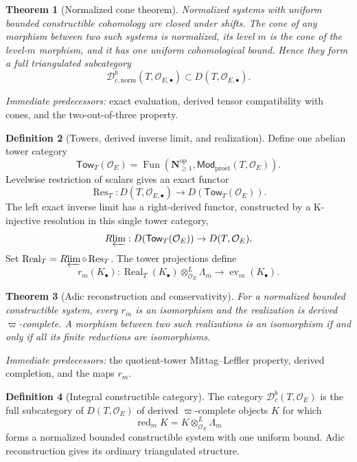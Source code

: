 \documentclass[10pt]{article}
\newtheorem{theorem}{Theorem}[section]
\theoremstyle{definition}
\newtheorem{definition}[theorem]{Definition}
\newcommand{\Dbc}{\mathcal D^b_c}
\newcommand{\Dbcnorm}{\mathcal D^b_{c,\mathrm{norm}}}
\newcommand{\Mod}{\mathsf{Mod}}
\newcommand{\pred}[1]{\par\smallskip\begingroup\footnotesize\raggedright
\emph{Immediate predecessors:} #1.\par\endgroup}
\begin{document}
\begin{theorem}[Normalized cone theorem]
Normalized systems with uniform bounded constructible cohomology are
closed under shifts.  The cone of any morphism between two such systems is
normalized, its level \(m\) is the cone of the level-\(m\) morphism, and it
has one uniform cohomological bound.  Hence they form a full triangulated
subcategory
\[
 \Dbcnorm(T,\mathcal O_{E,\bullet})
 \subset D(T,\mathcal O_{E,\bullet}).
\]
\end{theorem}
\pred{exact evaluation, derived tensor compatibility with cones, and the two-out-of-three property}

\begin{definition}[Towers, derived inverse limit, and realization]
Define one abelian tower category
\[
 \mathsf{Tow}_T(\mathcal O_E)=
 \operatorname{Fun}(\mathbf N_{\ge1}^{\mathrm{op}},
                    \Mod_{\mathrm{pro\acute et}}(T,\mathcal O_E)).
\]
Levelwise restriction of scalars gives an exact functor
\[
 \operatorname{Res}_T:
 D(T,\mathcal O_{E,\bullet})
 \longrightarrow D(\mathsf{Tow}_T(\mathcal O_E)).
\]
The left exact inverse limit has a right-derived functor, constructed by a
K-injective resolution in this single tower category,
\[
 R\!\varprojlim:
 D(\mathsf{Tow}_T(\mathcal O_E))\to D(T,\mathcal O_E).
\]
Set
\(\operatorname{Real}_T=R\!\varprojlim\circ\operatorname{Res}_T\).
The tower projections define
\[
 r_m(K_\bullet):
 \operatorname{Real}_T(K_\bullet)
 \otimes^L_{\mathcal O_E}\Lambda_m
 \longrightarrow\operatorname{ev}_m(K_\bullet).
\]
\end{definition}

\begin{theorem}[Adic reconstruction and conservativity]
For a normalized bounded constructible system, every \(r_m\) is an
isomorphism and the realization is derived \(\varpi\)-complete.  A morphism
between two such realizations is an isomorphism if and only if all its
finite reductions are isomorphisms.
\end{theorem}
\pred{the quotient-tower Mittag--Leffler property, derived completion, and the maps \(r_m\)}

\begin{definition}[Integral constructible category]
The category \(\Dbc(T,\mathcal O_E)\) is the full subcategory of
\(D(T,\mathcal O_E)\) of derived \(\varpi\)-complete objects \(K\) for which
\[
 \operatorname{red}_mK=
 K\otimes^L_{\mathcal O_E}\Lambda_m
\]
forms a normalized bounded constructible system with one uniform bound.
Adic reconstruction gives its ordinary triangulated structure.
\end{definition}
\end{document}
